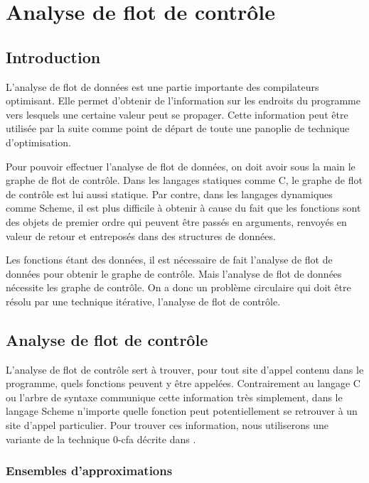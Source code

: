 \chapter{Analyse de flot de contrôle}

\section{Introduction}

L'analyse de flot de données est une partie importante des
compilateurs optimisant. Elle permet d'obtenir de l'information sur
les endroits du programme vers lesquels une certaine valeur peut se
propager. Cette information peut être utilisée par la suite comme
point de départ de toute une panoplie de technique d'optimisation.

Pour pouvoir effectuer l'analyse de flot de données, on doit avoir
sous la main le graphe de flot de contrôle. Dans les langages
statiques comme C, le graphe de flot de contrôle est lui aussi
statique. Par contre, dans les langages dynamiques comme Scheme, il
est plus difficile à obtenir à cause du fait que les fonctions sont
des objets de premier ordre qui peuvent être passés en arguments,
renvoyés en valeur de retour et entreposés dans des structures de
données.

Les fonctions étant des données, il est nécessaire de fait l'analyse de
flot de données pour obtenir le graphe de contrôle. Mais l'analyse de
flot de données nécessite les graphe de contrôle. On a donc un
problème circulaire qui doit être résolu par une technique itérative,
l'analyse de flot de contrôle.

\clearpage

\section{Analyse de flot de contrôle}

L'analyse de flot de contrôle sert à trouver, pour tout site d'appel
contenu dans le programme, quels fonctions peuvent y être
appelées. Contrairement au langage C ou l'arbre de syntaxe communique
cette information très simplement, dans le langage Scheme n'importe
quelle fonction peut potentiellement se retrouver à un site d'appel
particulier. Pour trouver ces information, nous utiliserons une
variante de la technique 0-cfa décrite dans \cite{shivers88, shivers91}.

\subsection{Ensembles d'approximations}


